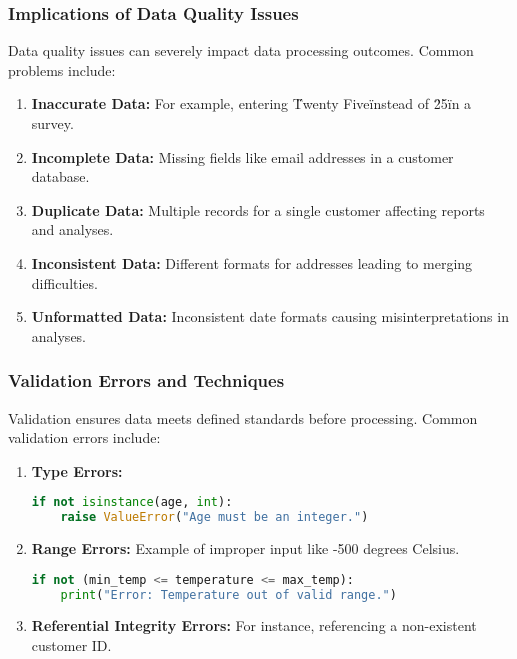 \documentclass[aspectratio=169]{beamer}
\begin{document}
\begin{frame}
    \frametitle{Implications of Data Quality Issues}
    Data quality issues can severely impact data processing outcomes. Common problems include:
    \begin{enumerate}
        \item \textbf{Inaccurate Data:} For example, entering \"Twenty Five\" instead of \"25\" in a survey.
        
        \item \textbf{Incomplete Data:} Missing fields like email addresses in a customer database.
        
        \item \textbf{Duplicate Data:} Multiple records for a single customer affecting reports and analyses.
        
        \item \textbf{Inconsistent Data:} Different formats for addresses leading to merging difficulties.
        
        \item \textbf{Unformatted Data:} Inconsistent date formats causing misinterpretations in analyses.
    \end{enumerate}
\end{frame}

\begin{frame}[fragile]
    \frametitle{Validation Errors and Techniques}
    Validation ensures data meets defined standards before processing. Common validation errors include:
    \begin{enumerate}
        \item \textbf{Type Errors:}
        \begin{lstlisting}[language=Python]
if not isinstance(age, int):
    raise ValueError("Age must be an integer.")
        \end{lstlisting}
        
        \item \textbf{Range Errors:} Example of improper input like -500 degrees Celsius.
        \begin{lstlisting}[language=Python]
if not (min_temp <= temperature <= max_temp):
    print("Error: Temperature out of valid range.")
        \end{lstlisting}
        
        \item \textbf{Referential Integrity Errors:} For instance, referencing a non-existent customer ID.
    \end{enumerate}
\end{frame}
\end{document}
